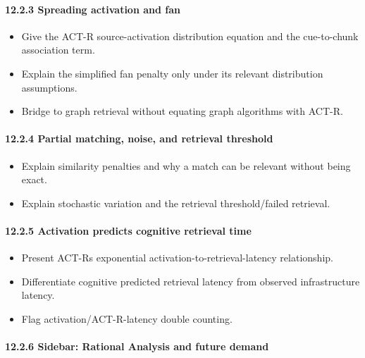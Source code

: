 \paragraph{12.2.3 Spreading activation and fan}\label{1223-spreading-activation-and-fan}

\begin{itemize}
\tightlist
\item
  Give the ACT-R source-activation distribution equation and the cue-to-chunk association term.
\item
  Explain the simplified fan penalty only under its relevant distribution assumptions.
\item
  Bridge to graph retrieval without equating graph algorithms with ACT-R.
\end{itemize}

\paragraph{12.2.4 Partial matching, noise, and retrieval threshold}\label{1224-partial-matching-noise-and-retrieval-threshold}

\begin{itemize}
\tightlist
\item
  Explain similarity penalties and why a match can be relevant without being exact.
\item
  Explain stochastic variation and the retrieval threshold/failed retrieval.
\end{itemize}

\paragraph{12.2.5 Activation predicts cognitive retrieval time}\label{1225-activation-predicts-cognitive-retrieval-time}

\begin{itemize}
\tightlist
\item
  Present ACT-R\textquotesingle s exponential activation-to-retrieval-latency relationship.
\item
  Differentiate cognitive predicted retrieval latency from observed infrastructure latency.
\item
  Flag activation/ACT-R-latency double counting.
\end{itemize}

\paragraph{12.2.6 Sidebar: Rational Analysis and future demand}\label{1226-sidebar-rational-analysis-and-future-demand}


